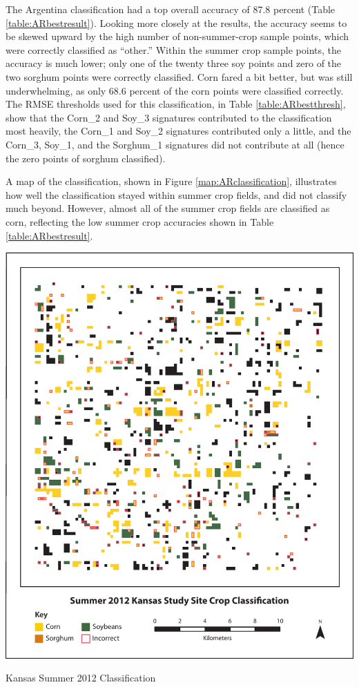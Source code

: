 The Argentina classification had a top overall accuracy of 87.8 percent (Table \ref{table:ARbestresult}). Looking more closely at the results, the accuracy seems to be skewed upward by the high number of non-summer-crop sample points, which were correctly classified as ``other.'' Within the summer crop sample points, the accuracy is much lower; only one of the twenty three soy points and zero of the two sorghum points were correctly classified. Corn fared a bit better, but was still underwhelming, as only 68.6 percent of the corn points were classified correctly. The RMSE thresholds used for this classification, in Table \ref{table:ARbestthresh}, show that the Corn\_2 and Soy\_3 signatures contributed to the classification most heavily, the Corn\_1 and Soy\_2 signatures contributed only a little, and the Corn\_3, Soy\_1, and the Sorghum\_1 signatures did not contribute at all (hence the zero points of sorghum classified).

A map of the classification, shown in Figure \ref{map:ARclassification}, illustrates how well the classification stayed within summer crop fields, and did not classify much beyond. However, almost all of the summer crop fields are classified as corn, reflecting the low summer crop accuracies shown in Table \ref{table:ARbestresult}.

\begin{ssfigure}
  \centering
  \includegraphics[width=\textwidth]{Graphics/KSclass.pdf}
  \caption{Kansas Summer 2012 Classification}
  \label{map:KSclassification}
\end{ssfigure}

